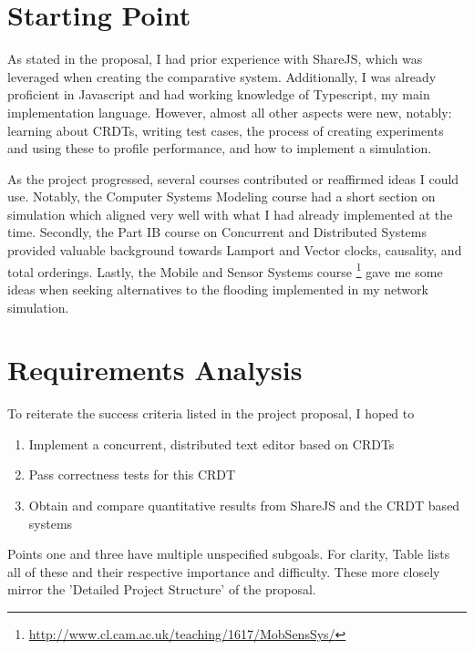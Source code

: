 \documentclass[12pt,a4paper,twoside,openright]{report}
\begin{document}
\section{Starting Point}

As stated in the proposal, I had prior experience with ShareJS, which was leveraged when creating the comparative system. Additionally, I was already proficient in Javascript and had working knowledge of Typescript, my main implementation language. However, almost all other aspects were new, notably: learning about CRDTs, writing test cases, the process of creating experiments and using these to profile performance, and how to implement a simulation.

As the project progressed, several courses contributed or reaffirmed ideas I could use. Notably, the Computer Systems Modeling \cite{compsysmodeling} course had a short section on simulation which aligned very well with what I had already implemented at the time. Secondly, the Part IB course on Concurrent and Distributed Systems \cite{concdistsystems} provided valuable background towards Lamport and Vector clocks, causality, and total orderings. Lastly, the Mobile and Sensor Systems course \footnote{\url{http://www.cl.cam.ac.uk/teaching/1617/MobSensSys/}} gave me some ideas when seeking alternatives to the flooding implemented in my network simulation.

\section{Requirements Analysis}
To reiterate the success criteria listed in the project proposal, I hoped to

\begin{enumerate}
\item Implement a concurrent, distributed text editor based on CRDTs 
\item Pass correctness tests for this CRDT
\item Obtain and compare quantitative results from ShareJS and the CRDT based systems
\end{enumerate}

Points one and three have multiple unspecified subgoals. For clarity, Table lists all of these and their respective importance and difficulty. These more closely mirror the 'Detailed Project Structure' of the proposal.
\end{document}
